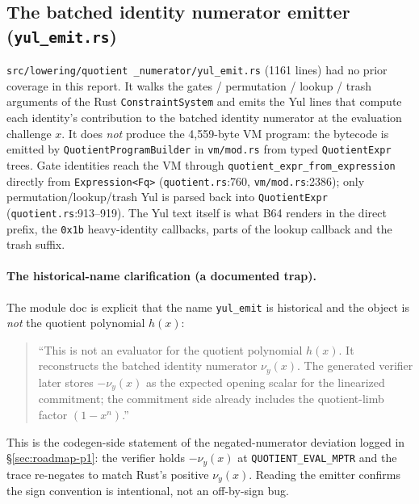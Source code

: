 \subsection{The batched identity numerator emitter (\texttt{yul\_emit.rs})}
\label{sec:pr-yul-emit}

\texttt{src/lowering/quotient\allowbreak
\_numerator/yul\allowbreak \_emit.rs} (1161 lines) had no prior
coverage in this report. It walks the gates / permutation /
lookup / trash arguments of the Rust \texttt{ConstraintSystem}
and emits the Yul lines that compute each identity's contribution
to the batched identity numerator at the evaluation challenge $x$.
 It does \emph{not} produce the 4,559-byte VM
program: the bytecode is emitted by \texttt{QuotientProgramBuilder}
in \texttt{vm/mod.rs} from typed \texttt{QuotientExpr} trees. Gate
identities reach the VM through
\texttt{quotient\_\allowbreak{}expr\_\allowbreak{}from\_\allowbreak{}expression} directly from
\texttt{Expression<Fq>} (\texttt{quotient.rs}:760, \texttt{vm/mod.rs}:2386);
only permutation/lookup/trash Yul is parsed back into
\texttt{QuotientExpr} (\texttt{quotient.rs}:913--919). The Yul
text itself is what B64 renders in the direct prefix, the
\texttt{0x1b} heavy-identity callbacks, parts of the lookup
callback and the trash suffix.

\paragraph{The historical-name clarification (a documented trap).}
The module doc is explicit that the name \texttt{yul\_emit} is
historical and the object is \emph{not} the quotient polynomial
$h(x)$:
\begin{quote}
\small ``This is not an evaluator for the quotient polynomial
$h(x)$. It reconstructs the batched identity numerator
$\nu_y(x)$. The generated verifier later stores $-\nu_y(x)$ as
the expected opening scalar for the linearized commitment; the
commitment side already includes the quotient-limb factor
$(1-x^n)$.''
\end{quote}
This is the codegen-side statement of the negated-numerator
deviation logged in §\ref{sec:roadmap-p1}: the verifier holds
$-\nu_y(x)$ at \texttt{QUOTIENT\_\allowbreak{}EVAL\_\allowbreak{}MPTR} and the trace
re-negates to match Rust's positive $\nu_y(x)$. Reading the
emitter confirms the sign convention is intentional, not an
off-by-sign bug.

